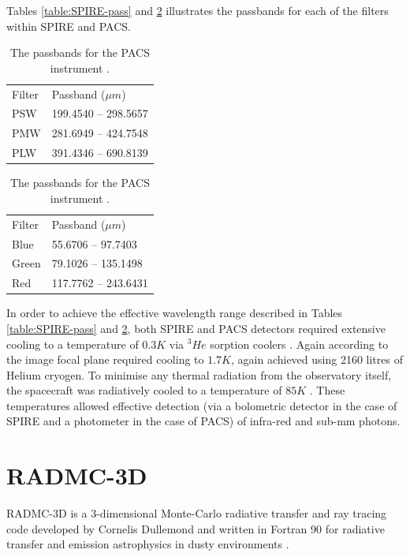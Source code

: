 \documentclass{report}
\begin{document}
Tables \ref{table:SPIRE-pass} and \ref{table:PACS-pass} illustrates the passbands for each of the filters within SPIRE and PACS.

\begin{table}[h]
  \parbox{.42\linewidth}{
  \centering
  \begin{tabular}{ll}
  Filter & Passband ($\mu m$) \\
  PSW    &    199.4540 --	298.5657   \\
  PMW    &    281.6949 --	424.7548   \\
  PLW    &    391.4346 --	690.8139
  \end{tabular}
  \caption{The passbands (for extended source) for the SPIRE instrument \parencite{pass}.}
  \label{table:SPIRE-pass}
  }
  \parbox{.42\linewidth}{
  \centering
  \begin{tabular}{ll}
  Filter & Passband ($\mu m$) \\
  Blue   &    55.6706 -- 97.7403       \\
  Green  &    79.1026 --	135.1498       \\
  Red    &    117.7762 --	243.6431
  \end{tabular}
  \caption{The passbands for the PACS instrument \parencite{pass}.}
  \label{table:PACS-pass}
  }
\end{table}

In order to achieve the effective wavelength range described in Tables \ref{table:SPIRE-pass} and \ref{table:PACS-pass}, both SPIRE and PACS detectors required extensive cooling to a temperature of $0.3 K$ via $^{3}{He}$ sorption coolers \parencite{herschel}. Again according to \textcite{herschel} the image focal plane required cooling to $1.7 K$, again achieved using 2160 litres of Helium cryogen. To minimise any thermal radiation from the observatory itself, the spacecraft was radiatively cooled to a temperature of $85 K$ \parencite{herschel}. These temperatures allowed effective detection (via a bolometric detector in the case of SPIRE and a photometer in the case of PACS) of infra-red and sub-mm photons.

\section{RADMC-3D} \label{radmc}
RADMC-3D is a 3-dimensional Monte-Carlo radiative transfer and ray tracing code developed by Cornelis Dullemond and written in Fortran 90 for radiative transfer and emission astrophysics in dusty environments \parencite{RADMC-3D}.
\end{document}
